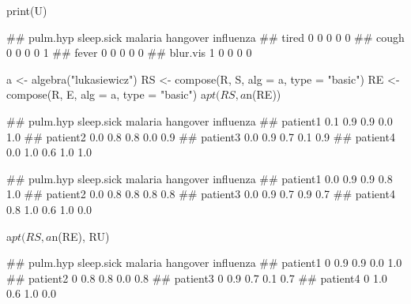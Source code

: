 \documentclass{article}\usepackage[]{graphicx}\usepackage[]{color}
\begin{document}
\begin{Schunk}
% --begin: "comp.u"
\begin{Sinput}
print(U)
\end{Sinput}
\begin{Soutput}
##          pulm.hyp sleep.sick malaria hangover influenza
## tired           0          0       0        0         0
## cough           0          0       0        0         1
## fever           0          0       0        0         0
## blur.vis        1          0       0        0         0
\end{Soutput}
%
% --end: "comp.u"
\end{Schunk}

\begin{Schunk}
% --begin: "comp.circ.excl"
\begin{Sinput}
a <- algebra("lukasiewicz")
RS <- compose(R, S, alg = a, type = "basic")
RE <- compose(R, E, alg = a, type = "basic")
a$pt(RS, a$n(RE))
\end{Sinput}
\begin{Soutput}
##          pulm.hyp sleep.sick malaria hangover influenza
## patient1      0.1        0.9     0.9      0.0       1.0
## patient2      0.0        0.8     0.8      0.0       0.9
## patient3      0.0        0.9     0.7      0.1       0.9
## patient4      0.0        1.0     0.6      1.0       1.0
\end{Soutput}
%
% --end: "comp.circ.excl"
\end{Schunk}

\begin{Schunk}
% --begin: "comp.circ.unavoid"
\begin{Soutput}
##          pulm.hyp sleep.sick malaria hangover influenza
## patient1      0.0        0.9     0.9      0.8       1.0
## patient2      0.0        0.8     0.8      0.8       0.8
## patient3      0.0        0.9     0.7      0.9       0.7
## patient4      0.8        1.0     0.6      1.0       0.0
\end{Soutput}
%
% --end: "comp.circ.unavoid"
\end{Schunk}

\begin{Schunk}
% --begin: "comp.circ.excl.unavoid"
\begin{Sinput}
a$pt(RS, a$n(RE), RU)
\end{Sinput}
\begin{Soutput}
##          pulm.hyp sleep.sick malaria hangover influenza
## patient1        0        0.9     0.9      0.0       1.0
## patient2        0        0.8     0.8      0.0       0.8
## patient3        0        0.9     0.7      0.1       0.7
## patient4        0        1.0     0.6      1.0       0.0
\end{Soutput}
%
% --end: "comp.circ.excl.unavoid"
\end{Schunk}
\end{document}
